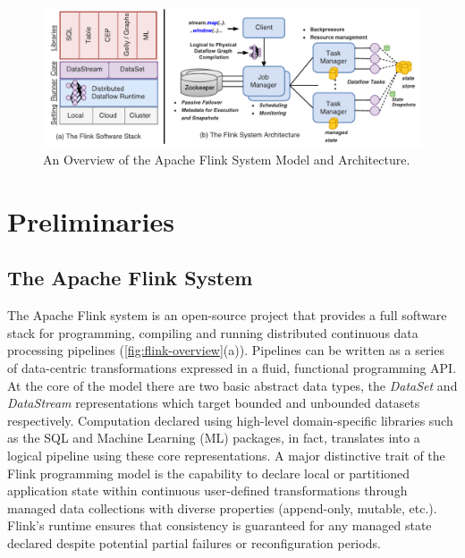 
\begin{figure}[t!]
\centering
\includegraphics[width=\textwidth]{figures/flinkoverview.pdf}
\caption{An Overview of the Apache Flink System Model and Architecture.} 
\label{fig:flink-overview}
\vspace{-4mm}
\end{figure}

\section{Preliminaries}

\subsection{The Apache Flink System}

The Apache Flink system \cite{CUSTOM:web/Flink} is an open-source project that provides a full software stack for programming, compiling and running distributed continuous data processing pipelines (\autoref{fig:flink-overview}(a)). Pipelines can be written as a series of data-centric transformations expressed in a fluid, functional programming API. At the core of the model there are two basic abstract data types, the \emph{DataSet} and \emph{DataStream} representations which target bounded and unbounded datasets respectively. Computation declared using high-level domain-specific libraries such as the SQL and Machine Learning (ML) packages, in fact, translates into a logical pipeline using these core representations. A major distinctive trait of the Flink programming model is the capability to declare local or partitioned application state within continuous user-defined transformations through managed data collections with diverse properties (append-only, mutable, etc.). Flink's runtime ensures that consistency is guaranteed for any managed state declared despite potential partial failures or reconfiguration periods.

